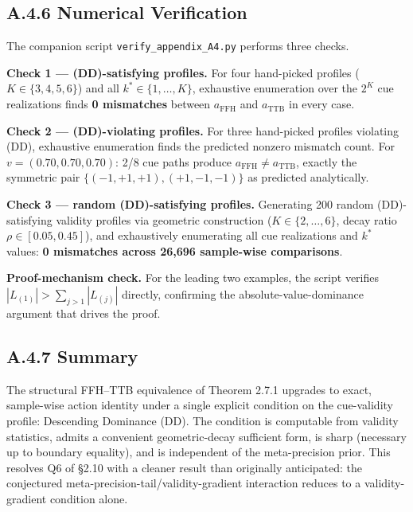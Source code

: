 \documentclass{article}
\begin{document}
\subsection{A.4.6 Numerical
Verification}\label{a.4.6-numerical-verification}

The companion script \texttt{verify\_appendix\_A4.py} performs three
checks.

\textbf{Check 1 --- (DD)-satisfying profiles.} For four hand-picked
profiles (\(K \in \{3, 4, 5, 6\}\)) and all
\(k^{*} \in \{1, \ldots, K\}\), exhaustive enumeration over the
\(2^{K}\) cue realizations finds \textbf{0 mismatches} between
\(a_{\mathrm{FFH}}\) and \(a_{\mathrm{TTB}}\) in every case.

\textbf{Check 2 --- (DD)-violating profiles.} For three hand-picked
profiles violating (DD), exhaustive enumeration finds the predicted
nonzero mismatch count. For \(v = (0.70, 0.70, 0.70)\): 2/8 cue paths
produce \(a_{\mathrm{FFH}} \neq a_{\mathrm{TTB}}\), exactly the
symmetric pair \(\{(-1, +1, +1), (+1, -1, -1)\}\) as predicted
analytically.

\textbf{Check 3 --- random (DD)-satisfying profiles.} Generating 200
random (DD)-satisfying validity profiles via geometric construction
(\(K \in \{2, \ldots, 6\}\), decay ratio \(\rho \in [0.05, 0.45]\)), and
exhaustively enumerating all cue realizations and \(k^{*}\) values:
\textbf{0 mismatches across 26,696 sample-wise comparisons}.

\textbf{Proof-mechanism check.} For the leading two examples, the script
verifies \(|L_{(1)}| > \sum_{j>1} |L_{(j)}|\) directly, confirming the
absolute-value-dominance argument that drives the proof.

\subsection{A.4.7 Summary}\label{a.4.7-summary}

The structural FFH--TTB equivalence of Theorem 2.7.1 upgrades to exact,
sample-wise action identity under a single explicit condition on the
cue-validity profile: Descending Dominance (DD). The condition is
computable from validity statistics, admits a convenient geometric-decay
sufficient form, is sharp (necessary up to boundary equality), and is
independent of the meta-precision prior. This resolves Q6 of \S{}2.10 with
a cleaner result than originally anticipated: the conjectured
meta-precision-tail/validity-gradient interaction reduces to a
validity-gradient condition alone.
\end{document}
